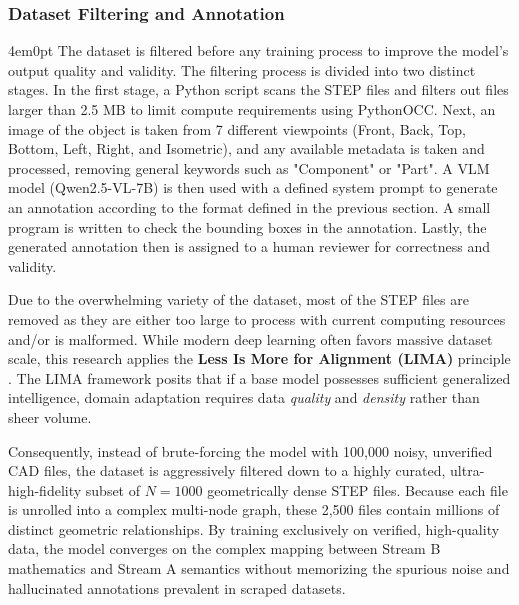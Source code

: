 		\subsubsection{Dataset Filtering and Annotation}
			\begin{indentedblock}{4em}{0pt}
				The dataset is filtered before any training process to improve the model's output quality and validity. The filtering process is divided into two distinct stages. In the first stage, a Python script scans the STEP files and filters out files larger than 2.5 MB to limit compute requirements using PythonOCC. Next, an image of the object is taken from 7 different viewpoints (Front, Back, Top, Bottom, Left, Right, and Isometric), and any available metadata is taken and processed, removing general keywords such as "Component" or "Part". A VLM model (Qwen2.5-VL-7B) is then used with a defined system prompt to generate an annotation according to the format defined in the previous section. A small program is written to check the bounding boxes in the annotation. Lastly, the generated annotation then is assigned to a human reviewer for correctness and validity. 
				
				
				Due to the overwhelming variety of the dataset, most of the STEP files are removed as they are either too large to process with current computing resources and/or is malformed. While modern deep learning often favors massive dataset scale, this research applies the \textbf{Less Is More for Alignment (LIMA)} principle \parencite{lima_zhou}. The LIMA framework posits that if a base model possesses sufficient generalized intelligence, domain adaptation requires data \textit{quality} and \textit{density} rather than sheer volume. 

								
				Consequently, instead of brute-forcing the model with 100,000 noisy, unverified CAD files, the dataset is aggressively filtered down to a highly curated, ultra-high-fidelity subset of $N=1000$ geometrically dense STEP files. Because each file is unrolled into a complex multi-node graph, these 2,500 files contain millions of distinct geometric relationships. By training exclusively on verified, high-quality data, the model converges on the complex mapping between Stream B mathematics and Stream A semantics without memorizing the spurious noise and hallucinated annotations prevalent in scraped datasets.
				
			\end{indentedblock}
	
